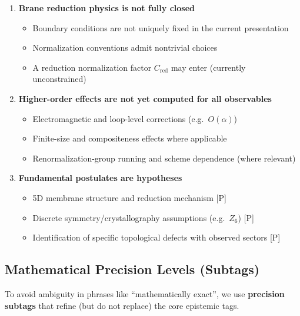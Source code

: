 \begin{enumerate}
\item \textbf{Brane reduction physics is not fully closed}
\begin{itemize}
\item Boundary conditions are not uniquely fixed in the current presentation
\item Normalization conventions admit nontrivial choices
\item A reduction normalization factor $C_{\mathrm{red}}$ may enter (currently unconstrained)
\end{itemize}

\item \textbf{Higher-order effects are not yet computed for all observables}
\begin{itemize}
\item Electromagnetic and loop-level corrections (e.g.\ $O(\alpha)$)
\item Finite-size and compositeness effects where applicable
\item Renormalization-group running and scheme dependence (where relevant)
\end{itemize}

\item \textbf{Fundamental postulates are hypotheses}
\begin{itemize}
\item 5D membrane structure and reduction mechanism [P]
\item Discrete symmetry/crystallography assumptions (e.g.\ $Z_6$) [P]
\item Identification of specific topological defects with observed sectors [P]
\end{itemize}
\end{enumerate}


\subsection*{Mathematical Precision Levels (Subtags)}

To avoid ambiguity in phrases like ``mathematically exact'', we use \textbf{precision subtags}
that refine (but do not replace) the core epistemic tags.

